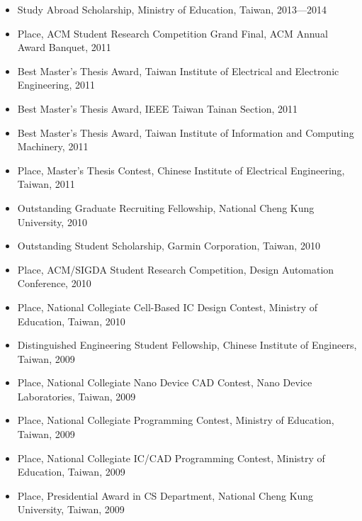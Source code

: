 \documentclass[A4,11pt]{article}
\begin{document}
\begin{itemize}
    \item Study Abroad Scholarship, Ministry of Education, Taiwan, 2013—2014
    \item {} Place, ACM Student Research Competition Grand Final, ACM Annual Award Banquet, 2011
    \item Best Master’s Thesis Award, Taiwan Institute of Electrical and Electronic Engineering, 2011
    \item Best Master’s Thesis Award, IEEE Taiwan Tainan Section, 2011
    \item Best Master’s Thesis Award, Taiwan Institute of Information and Computing Machinery, 2011
    \item {} Place, Master’s Thesis Contest, Chinese Institute of Electrical Engineering, Taiwan, 2011
    \item Outstanding Graduate Recruiting Fellowship, National Cheng Kung University, 2010
    \item Outstanding Student Scholarship, Garmin Corporation, Taiwan, 2010
    \item {} Place, ACM/SIGDA Student Research Competition, Design Automation Conference, 2010
    \item {} Place, National Collegiate Cell-Based IC Design Contest, Ministry of Education, Taiwan, 2010
    \item Distinguished Engineering Student Fellowship, Chinese Institute of Engineers, Taiwan, 2009
    \item {} Place, National Collegiate Nano Device CAD Contest, Nano Device Laboratories, Taiwan, 2009
    \item {} Place, National Collegiate Programming Contest, Ministry of Education, Taiwan, 2009
    \item {} Place, National Collegiate IC/CAD Programming Contest, Ministry of Education, Taiwan, 2009
    \item {} Place, Presidential Award in CS Department, National Cheng Kung University, Taiwan, 2009

 \end{itemize}

\end{document}
